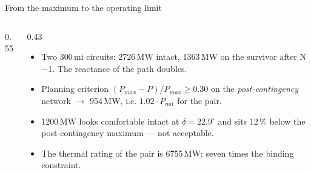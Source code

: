\begin{frame}{From the maximum to the operating limit}
  \begin{columns}[c,onlytextwidth]
    \begin{column}{0.55\textwidth}\centering
    \end{column}
    \begin{column}{0.43\textwidth}
      {\footnotesize
      \begin{itemize}
        \setlength{\itemsep}{0.4em}
        \item Two 300\,mi circuits: 2726\,MW intact, 1363\,MW on the
              survivor after N$-$1. The reactance of the path doubles.
        \item Planning criterion
              $\left(P_{max}-P\right)/P_{max}\ge0.30$ on the
              \emph{post-contingency} network $\rightarrow$ 954\,MW, i.e.
              $1.02\cdot P_{nat}$ for the pair.
        \item 1200\,MW looks comfortable intact at $\delta=22.9^\circ$
              and sits $12\,\%$ below the post-contingency maximum ---
              not acceptable.
        \item The thermal rating of the pair is 6755\,MW: seven times the
              binding constraint.
      \end{itemize}}
    \end{column}
  \end{columns}
\end{frame}

